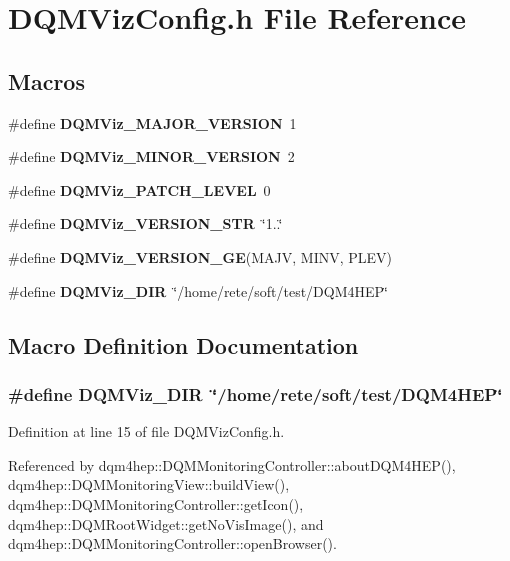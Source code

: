 \section{D\+Q\+M\+Viz\+Config.\+h File Reference}
\label{DQMVizConfig_8h}
\subsection*{Macros}
\begin{DoxyCompactItemize}
\item 
\#define {\bf D\+Q\+M\+Viz\+\_\+\+M\+A\+J\+O\+R\+\_\+\+V\+E\+R\+S\+I\+O\+N}~1
\item 
\#define {\bf D\+Q\+M\+Viz\+\_\+\+M\+I\+N\+O\+R\+\_\+\+V\+E\+R\+S\+I\+O\+N}~2
\item 
\#define {\bf D\+Q\+M\+Viz\+\_\+\+P\+A\+T\+C\+H\+\_\+\+L\+E\+V\+E\+L}~0
\item 
\#define {\bf D\+Q\+M\+Viz\+\_\+\+V\+E\+R\+S\+I\+O\+N\+\_\+\+S\+T\+R}~\char`\"{}1..\char`\"{}
\item 
\#define {\bf D\+Q\+M\+Viz\+\_\+\+V\+E\+R\+S\+I\+O\+N\+\_\+\+G\+E}(M\+A\+J\+V, M\+I\+N\+V, P\+L\+E\+V)
\item 
\#define {\bf D\+Q\+M\+Viz\+\_\+\+D\+I\+R}~\char`\"{}/home/rete/soft/test/D\+Q\+M4\+H\+E\+P\char`\"{}
\end{DoxyCompactItemize}


\subsection{Macro Definition Documentation}
\subsubsection[{D\+Q\+M\+Viz\+\_\+\+D\+I\+R}]{\setlength{\rightskip}{0pt plus 5cm}\#define D\+Q\+M\+Viz\+\_\+\+D\+I\+R~\char`\"{}/home/rete/soft/test/D\+Q\+M4\+H\+E\+P\char`\"{}}\label{DQMVizConfig_8h_abf4bf4d374673b2ac8aede7c327e25b8}


Definition at line 15 of file D\+Q\+M\+Viz\+Config.\+h.



Referenced by dqm4hep\+::\+D\+Q\+M\+Monitoring\+Controller\+::about\+D\+Q\+M4\+H\+E\+P(), dqm4hep\+::\+D\+Q\+M\+Monitoring\+View\+::build\+View(), dqm4hep\+::\+D\+Q\+M\+Monitoring\+Controller\+::get\+Icon(), dqm4hep\+::\+D\+Q\+M\+Root\+Widget\+::get\+No\+Vis\+Image(), and dqm4hep\+::\+D\+Q\+M\+Monitoring\+Controller\+::open\+Browser().

